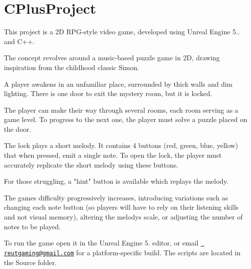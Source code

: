 \chapter{CPlus\+Project}
\hypertarget{index}{}\label{index}
This project is a 2D RPG-\/style video game, developed using Unreal Engine 5.. and C++.

The concept revolves around a music-\/based puzzle game in 2D, drawing inspiration from the childhood classic Simon.

A player awakens in an unfamiliar place, surrounded by thick walls and dim lighting. There is one door to exit the mystery room, but it is locked.

The player can make their way through several rooms, each room serving as a game level. To progress to the next one, the player must solve a puzzle placed on the door.

The lock plays a short melody. It contains 4 buttons (red, green, blue, yellow) that when pressed, emit a single note. To open the lock, the player must accurately replicate the short melody using these buttons.

For those struggling, a "{}hint"{} button is available which replays the melody.

The game\textquotesingle{}s difficulty progressively increases, introducing variations such as changing each note button (so players will have to rely on their listening skills and not visual memory), altering the melody\textquotesingle{}s scale, or adjusting the number of notes to be played.

To run the game open it in the Unreal Engine 5. editor, or email \href{mailto:reutgaming@gmail.com}{\texttt{ reutgaming@gmail.\+com}} for a platform-\/specific build. The scripts are located in the Source folder. 